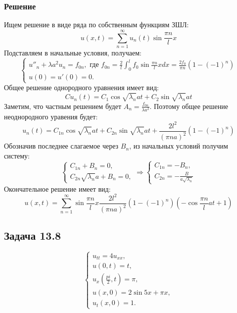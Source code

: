 \documentclass[11pt]{article}
\begin{document}
\subsubsection{Решение}
\label{sec:org74fdd42}
Ищем решение в виде ряда по собственным функциям ЗШЛ:
\begin{equation}
u(x, t) = \sum_{n = 1}^{\infty}u_n(t)\sin\frac{\pi n}lx
\end{equation}
Подставляем в начальные условия, получаем:
\begin{equation}
\begin{cases}
u''_n + \lambda a^2u_n = f_{0n}, \text{ где } f_{0n} = \frac2l\int_0^lf_0\sin\frac{\pi n}lxdx = \frac{2f_0}{\pi n}(1 - (-1)^n) \\
u(0) = u'(0) = 0.
\end{cases}
\end{equation}
Общее решение однородного уравнения имеет вид:
\begin{equation}
Cu_n(t) = C_1\cos\sqrt{\lambda_n}at + C_2\sin\sqrt{\lambda_n}at
\end{equation}
Заметим, что частным решением будет $A_n = \frac{f_{0n}}{\lambda a^2}$. Поэтому общее решение
неоднородного уравения будет:
\begin{equation}
u_n(t) = C_{1n}\cos\sqrt{\lambda_n}at + C_{2n}\sin\sqrt{\lambda_n}at + \frac{2l^2}{(\pi na)^2}(1 - (-1)^n)
\end{equation}
Обозначив последнее слагаемое через $B_n$, из начальных условий получим систему:
\begin{equation}
\begin{cases}
C_{1n} + B_n = 0, \\
C_{2n}\sqrt{\lambda_n}a + B_n = 0,
\end{cases}
\Rightarrow
\begin{cases}
C_{1n} = -B_n, \\
C_{2n} = -\frac{B}{a\sqrt{\lambda_n}}
\end{cases}
\end{equation}
Окончательное решение имеет вид:
\begin{equation}
u(x, t) = \sum_{n = 1}^{\infty}\sin\frac{\pi n}lx\frac{2l^2}{(\pi n a)^2}(1 - (-1)^n)\left(-\cos\frac{\pi n}lat + 1\right)
\end{equation}
\subsection{Задача 13.8}
\label{sec:org762e92d}
\begin{equation}
\begin{cases}
u_{tt} = 4u_{xx}, \\
u(0, t) = t, \\
u_x\left(\frac{pi}2, t\right) = \pi, \\
u(x, 0) = 2\sin5x + \pi x, \\
u_t(x, 0) = 1.
\end{cases}
\end{equation}
\end{document}
